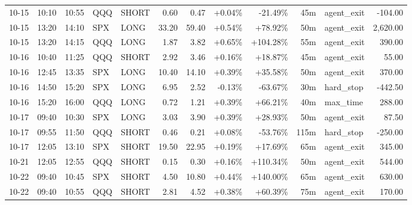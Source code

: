 \documentclass[11pt,a4paper,twoside]{article}
\begin{document}
\begin{center}
\begin{longtable}{>{\color{txtmain}}l l l l l r r r r r >{\color{txtmain}}l r}
10-15 & 10:10 & 10:55 & QQQ & SHORT & 0.60 & 0.47 & \textcolor{wingreen}{+0.04\%} & \textcolor{lossred}{-21.49\%} & 45m & agent\_exit & \textcolor{lossred}{-104.00} \\
10-15 & 13:20 & 14:10 & SPX & LONG & 33.20 & 59.40 & \textcolor{wingreen}{+0.54\%} & \textcolor{wingreen}{+78.92\%} & 50m & agent\_exit & \textcolor{wingreen}{2,620.00} \\
10-15 & 13:20 & 14:15 & QQQ & LONG & 1.87 & 3.82 & \textcolor{wingreen}{+0.65\%} & \textcolor{wingreen}{+104.28\%} & 55m & agent\_exit & \textcolor{wingreen}{390.00} \\
10-16 & 10:40 & 11:25 & QQQ & SHORT & 2.92 & 3.46 & \textcolor{wingreen}{+0.16\%} & \textcolor{wingreen}{+18.87\%} & 45m & agent\_exit & \textcolor{wingreen}{55.00} \\
10-16 & 12:45 & 13:35 & SPX & LONG & 10.40 & 14.10 & \textcolor{wingreen}{+0.39\%} & \textcolor{wingreen}{+35.58\%} & 50m & agent\_exit & \textcolor{wingreen}{370.00} \\
10-16 & 14:50 & 15:20 & SPX & LONG & 6.95 & 2.52 & \textcolor{lossred}{-0.13\%} & \textcolor{lossred}{-63.67\%} & 30m & hard\_stop & \textcolor{lossred}{-442.50} \\
10-16 & 15:20 & 16:00 & QQQ & LONG & 0.72 & 1.21 & \textcolor{wingreen}{+0.39\%} & \textcolor{wingreen}{+66.21\%} & 40m & max\_time & \textcolor{wingreen}{288.00} \\
10-17 & 09:40 & 10:30 & SPX & LONG & 3.03 & 3.90 & \textcolor{wingreen}{+0.39\%} & \textcolor{wingreen}{+28.93\%} & 50m & agent\_exit & \textcolor{wingreen}{87.50} \\
10-17 & 09:55 & 11:50 & QQQ & SHORT & 0.46 & 0.21 & \textcolor{wingreen}{+0.08\%} & \textcolor{lossred}{-53.76\%} & 115m & hard\_stop & \textcolor{lossred}{-250.00} \\
10-17 & 12:05 & 13:10 & SPX & SHORT & 19.50 & 22.95 & \textcolor{wingreen}{+0.19\%} & \textcolor{wingreen}{+17.69\%} & 65m & agent\_exit & \textcolor{wingreen}{345.00} \\
10-21 & 12:05 & 12:55 & QQQ & SHORT & 0.15 & 0.30 & \textcolor{wingreen}{+0.16\%} & \textcolor{wingreen}{+110.34\%} & 50m & agent\_exit & \textcolor{wingreen}{544.00} \\
10-22 & 09:40 & 10:45 & SPX & SHORT & 4.50 & 10.80 & \textcolor{wingreen}{+0.44\%} & \textcolor{wingreen}{+140.00\%} & 65m & agent\_exit & \textcolor{wingreen}{630.00} \\
10-22 & 09:40 & 10:55 & QQQ & SHORT & 2.81 & 4.52 & \textcolor{wingreen}{+0.38\%} & \textcolor{wingreen}{+60.39\%} & 75m & agent\_exit & \textcolor{wingreen}{170.00} \\

\end{longtable}
\end{center}
\end{document}
